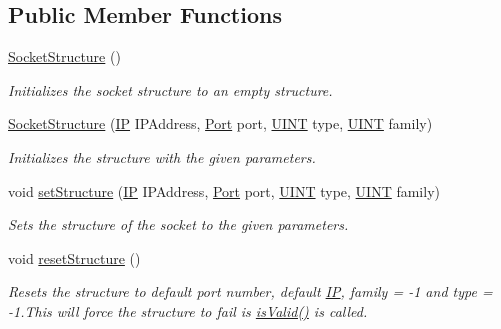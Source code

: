\subsection*{Public Member Functions}
\begin{DoxyCompactItemize}
\item 
\hyperlink{class_communication_1_1_socket_structure_ab741b5359897e17320ae2d1f494f21f4}{Socket\+Structure} ()
\begin{DoxyCompactList}\small\item\em Initializes the socket structure to an empty structure. \end{DoxyCompactList}\item 
\hyperlink{class_communication_1_1_socket_structure_a96cc18c1a9f36523f0645ae2993f997e}{Socket\+Structure} (\hyperlink{class_communication_1_1_i_p}{I\+P} I\+P\+Address, \hyperlink{class_communication_1_1_port}{Port} port, \hyperlink{typedefs_8h_a2e2c38961834f28c06e17e074eb00bc7}{U\+I\+N\+T} type, \hyperlink{typedefs_8h_a2e2c38961834f28c06e17e074eb00bc7}{U\+I\+N\+T} family)
\begin{DoxyCompactList}\small\item\em Initializes the structure with the given parameters. \end{DoxyCompactList}\item 
void \hyperlink{class_communication_1_1_socket_structure_a991b1dea09771ac634f574b1b6dbefe5}{set\+Structure} (\hyperlink{class_communication_1_1_i_p}{I\+P} I\+P\+Address, \hyperlink{class_communication_1_1_port}{Port} port, \hyperlink{typedefs_8h_a2e2c38961834f28c06e17e074eb00bc7}{U\+I\+N\+T} type, \hyperlink{typedefs_8h_a2e2c38961834f28c06e17e074eb00bc7}{U\+I\+N\+T} family)
\begin{DoxyCompactList}\small\item\em Sets the structure of the socket to the given parameters. \end{DoxyCompactList}\item 
void \hyperlink{class_communication_1_1_socket_structure_a09357914ed2d0967ad2f3b5ed7afafeb}{reset\+Structure} ()
\begin{DoxyCompactList}\small\item\em Resets the structure to default port number, default \hyperlink{class_communication_1_1_i_p}{I\+P}, family = -\/1 and type = -\/1.\+This will force the structure to fail is \hyperlink{class_communication_1_1_socket_structure_add4c226e6a517cd50505b9d80b74ab72}{is\+Valid()} is called. \end{DoxyCompactList}\item 

\end{DoxyCompactItemize}
